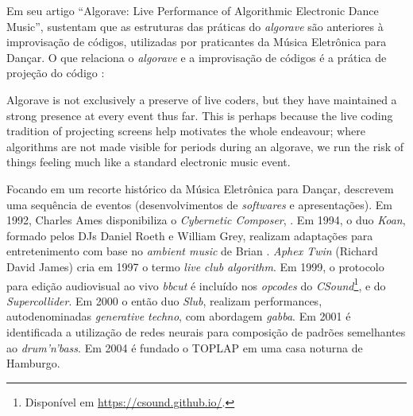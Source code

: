 Em seu artigo ``Algorave: Live Performance of Algorithmic Electronic Dance Music'',  sustentam que as estruturas das práticas do \emph{algorave} são anteriores à improvisação de códigos, utilizadas por praticantes da Música Eletrônica para Dançar. O que relaciona o \emph{algorave} e a improvisação de códigos é a prática de projeção do código :

\begin{citacao}
{Algorave is not exclusively a preserve of live coders, but they have maintained a strong presence at every event thus far. This is perhaps because the live coding tradition of projecting screens help motivates the whole endeavour; where algorithms are not made visible for periods during an algorave, we run the risk of things feeling much like a standard electronic music event.}

\end{citacao}

Focando em um recorte histórico da Música Eletrônica para Dançar,  descrevem uma sequência de eventos (desenvolvimentos de \emph{softwares} e apresentações). Em 1992, Charles Ames disponibiliza o \emph{Cybernetic Composer}, . Em 1994, o duo \emph{Koan}, formado pelos DJs Daniel Roeth e William Grey, realizam adaptações para entretenimento com base no \emph{ambient music} de Brian . \emph{Aphex Twin} (Richard David James) cria em 1997 o termo \emph{live club algorithm}. Em 1999, o protocolo para edição audiovisual ao vivo \emph{bbcut} \cite{collins_bbcut_2003} é incluído nos \emph{opcodes} do \emph{CSound}\footnote{Disponível em \url{https://csound.github.io/}.}, e do \emph{Supercollider}. Em 2000 o então duo \emph{Slub}, realizam performances, autodenominadas \emph{generative techno}, com abordagem \emph{gabba}. Em 2001 é identificada a utilização de redes neurais para composição de padrões semelhantes ao \emph{drum'n'bass}. Em 2004 é fundado o TOPLAP em uma casa noturna de Hamburgo.

